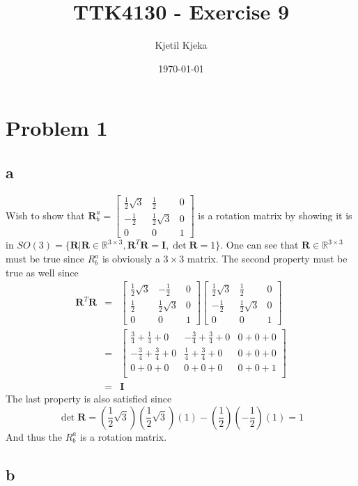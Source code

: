 \documentclass[11pt]{article}
\author{Kjetil Kjeka}
\title{TTK4130 - Exercise 9}
\date{\today}
\begin{document}
\maketitle
\section*{Problem 1}
\subsection*{a}
Wish to show that $\mathbf{R}_b^a = 
\begin{bmatrix}
\frac{1}{2} \sqrt{3} & \frac{1}{2} & 0 \\
-\frac{1}{2} & \frac{1}{2} \sqrt{3} & 0 \\
0 & 0 & 1
\end{bmatrix}
$ is a rotation matrix by showing it is in $SO(3) = 
\{\mathbf{R} | \mathbf{R} \in \mathbb{R}^{3\times3}, \mathbf{R}^T \mathbf{R} = \mathbf{I}, \det{\mathbf{R}} = 1 \}$. One can see that $\mathbf{R} \in \mathbb{R}^{3\times3}$ must be true since $R_b^a$ is obviously a $3\times3$ matrix. The second property must be true as well since 
\begin{eqnarray*}
\mathbf{R}^T \mathbf{R} &=& 
\begin{bmatrix}
\frac{1}{2} \sqrt{3} & -\frac{1}{2} & 0 \\
\frac{1}{2} & \frac{1}{2} \sqrt{3} & 0 \\
0 & 0 & 1
\end{bmatrix}
\begin{bmatrix}
\frac{1}{2} \sqrt{3} & \frac{1}{2} & 0 \\
-\frac{1}{2} & \frac{1}{2} \sqrt{3} & 0 \\
0 & 0 & 1
\end{bmatrix} \\
&=& 
\begin{bmatrix}
\frac{3}{4} + \frac{1}{4} + 0 & - \frac{3}{4} + \frac{3}{4} + 0 & 0 + 0 + 0 \\
- \frac{3}{4} + \frac{3}{4} + 0 & \frac{1}{4} + \frac{3}{4} + 0 & 0 + 0 + 0 \\
0 + 0 + 0 & 0 + 0 + 0 & 0 + 0 + 1 \\
\end{bmatrix} \\
&=&
\mathbf{I}
\end{eqnarray*}
The last property is also satisfied since
\[\det{\mathbf{R}} = (\frac{1}{2} \sqrt{3})(\frac{1}{2} \sqrt{3})(1) - (\frac{1}{2})(-\frac{1}{2})(1) = 1 \]
And thus the $R_b^a$ is a rotation matrix.

\subsection*{b}
\end{document}
